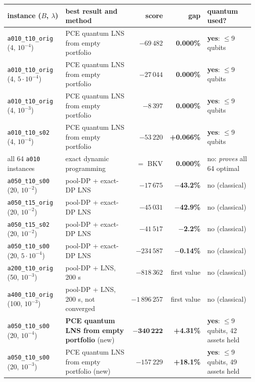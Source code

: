 \documentclass[11pt]{article}
\newcommand{\gapgood}[1]{\textcolor{good}{\textbf{#1}}}
\newcommand{\gapmid}[1]{\textcolor{mid}{\textbf{#1}}}
\begin{document}
\begin{center}
\renewcommand{\arraystretch}{1.08}\footnotesize
\begin{tabularx}{\textwidth}{@{}>{\raggedright\arraybackslash}p{40mm}Lrr>{\raggedright\arraybackslash}p{30mm}@{}}
\toprule
instance ($B$, $\lambda$) & best result and method & score & gap & quantum used?\\
\midrule
\texttt{a010\_t10\_orig} (4, $10^{-4}$) & PCE quantum LNS from empty portfolio & $-69\,482$ & \gapgood{0.000\%} & \textbf{yes}: $\le$9 qubits\\
\texttt{a010\_t10\_orig} (4, $5\cdot10^{-4}$) & PCE quantum LNS from empty portfolio & $-27\,044$ & \gapgood{0.000\%} & \textbf{yes}: $\le$9 qubits\\
\texttt{a010\_t10\_orig} (4, $10^{-3}$) & PCE quantum LNS from empty portfolio & $-8\,397$ & \gapgood{0.000\%} & \textbf{yes}: $\le$9 qubits\\
\texttt{a010\_t10\_s02} (4, $10^{-4}$) & PCE quantum LNS from empty portfolio & $-53\,220$ & \gapmid{+0.066\%} & \textbf{yes}: $\le$9 qubits\\
all 64 \texttt{a010} instances & exact dynamic programming & $=$ BKV & \gapgood{0.000\%} & no: \emph{proves} all 64 optimal\\
\texttt{a050\_t10\_s00} (20, $10^{-2}$) & pool-DP + exact-DP LNS & $-17\,675$ & \gapgood{$-$43.2\%} & no (classical)\\
\texttt{a050\_t15\_orig} (20, $10^{-2}$) & pool-DP + exact-DP LNS & $-45\,031$ & \gapgood{$-$42.9\%} & no (classical)\\
\texttt{a050\_t15\_s02} (20, $10^{-2}$) & pool-DP + exact-DP LNS & $-41\,517$ & \gapgood{$-$2.2\%} & no (classical)\\
\texttt{a050\_t10\_s00} (20, $5\cdot10^{-4}$) & pool-DP + exact-DP LNS & $-234\,587$ & \gapgood{$-$0.14\%} & no (classical)\\
\texttt{a200\_t10\_orig} (50, $10^{-3}$) & pool-DP + LNS, 200 s & $-818\,362$ & first value & no (classical)\\
\texttt{a400\_t10\_orig} (100, $10^{-3}$) & pool-DP + LNS, 200 s, not converged & $-1\,896\,257$ & first value & no (classical)\\
\texttt{a050\_t10\_s00} (20, $10^{-4}$) & \textbf{PCE quantum LNS from empty portfolio} (new) & $\mathbf{-340\,222}$ & \gapgood{+4.31\%} & \textbf{yes}: $\le$9 qubits, 42 assets held\\
\texttt{a050\_t10\_s00} (20, $10^{-3}$) & PCE quantum LNS from empty portfolio (new) & $-157\,229$ & \gapmid{+18.1\%} & \textbf{yes}: $\le$9 qubits, 49 assets held\\

\end{tabularx}
\end{center}
\end{document}
